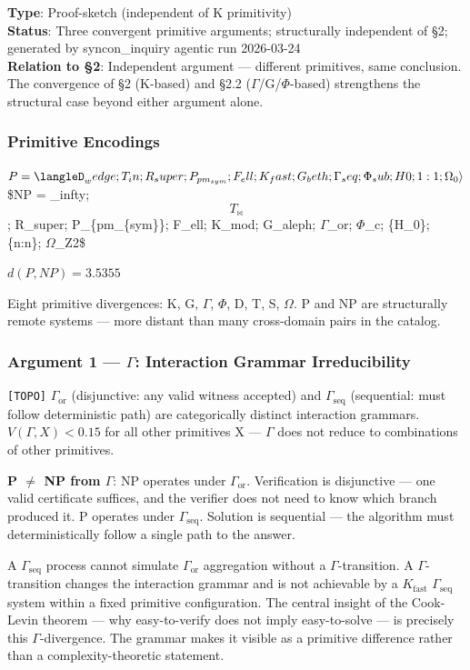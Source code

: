 \documentclass[12pt,a4paper]{article}
\newcommand{\pilcrow}{\S}
\begin{document}
\textbf{Type}: Proof-sketch (independent of K primitivity)   \\
\textbf{Status}: Three convergent primitive arguments; structurally independent of \pilcrow{}2; generated by syncon\_inquiry agentic run 2026-03-24   \\
\textbf{Relation to \pilcrow{}2}: Independent argument --- different primitives, same conclusion. The convergence of \pilcrow{}2 (K-based) and \pilcrow{}2.2 ($\Gamma$/G/$\Phi$-based) strengthens the structural case beyond either argument alone.

\subsubsection{Primitive Encodings}

$P  = \langleD_wedge; T_in;     R_super; P_{pm_{sym}}; F_ell; K_fast; G_beth;  \Gamma_seq; \Phi_sub; H0; {1:1}; \Omega_0\rangle$
\$NP = \langleD\_infty; $$T_{\bowtie}$$; R\_super; P\_\{pm\_\{sym\}\}; F\_ell; K\_mod;  G\_aleph; $\Gamma$\_or;  $\Phi$\_c;   \{H\_0\}; \{n:n\}; $\Omega$\_Z2\rangle\$

$d(P, NP) = 3.5355$

Eight primitive divergences: K, G, $\Gamma$, $\Phi$, D, T, S, $\Omega$. P and NP are structurally remote systems --- more distant than many cross-domain pairs in the catalog.

\subsubsection{Argument 1 --- $\Gamma$: Interaction Grammar Irreducibility}

\texttt{{[}TOPO{]}} $\Gamma_{\text{or}}$ (disjunctive: any valid witness accepted) and $\Gamma_{\text{seq}}$ (sequential: must follow deterministic path) are categorically distinct interaction grammars. $V(\Gamma, X) < 0.15$ for all other primitives X --- $\Gamma$ does not reduce to combinations of other primitives.

\textbf{P $\neq$ NP from $\Gamma$}: NP operates under $\Gamma_{\text{or}}$. Verification is disjunctive --- one valid certificate suffices, and the verifier does not need to know which branch produced it. P operates under $\Gamma_{\text{seq}}$. Solution is sequential --- the algorithm must deterministically follow a single path to the answer.

A $\Gamma_{\text{seq}}$ process cannot simulate $\Gamma_{\text{or}}$ aggregation without a $\Gamma$-transition. A $\Gamma$-transition changes the interaction grammar and is not achievable by a $K_{\text{fast}}$ $\Gamma_{\text{seq}}$ system within a fixed primitive configuration. The central insight of the Cook-Levin theorem --- why easy-to-verify does not imply easy-to-solve --- is precisely this $\Gamma$-divergence. The grammar makes it visible as a primitive difference rather than a complexity-theoretic statement.
\end{document}
